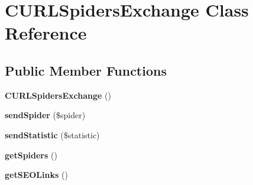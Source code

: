 \hypertarget{class_c_u_r_l_spiders_exchange}{\section{C\-U\-R\-L\-Spiders\-Exchange Class Reference}
\label{class_c_u_r_l_spiders_exchange}
}
\subsection*{Public Member Functions}
\begin{DoxyCompactItemize}
\item 
\hypertarget{class_c_u_r_l_spiders_exchange_ae9989880ce6be43808acebb93c9c927a}{{\bfseries C\-U\-R\-L\-Spiders\-Exchange} ()}\label{class_c_u_r_l_spiders_exchange_ae9989880ce6be43808acebb93c9c927a}

\item 
\hypertarget{class_c_u_r_l_spiders_exchange_acccb4227ead49e99ee69acf3e07f7d5a}{{\bfseries send\-Spider} (\$spider)}\label{class_c_u_r_l_spiders_exchange_acccb4227ead49e99ee69acf3e07f7d5a}

\item 
\hypertarget{class_c_u_r_l_spiders_exchange_a249fef51c925deaf1d5052e8b695567b}{{\bfseries send\-Statistic} (\$statistic)}\label{class_c_u_r_l_spiders_exchange_a249fef51c925deaf1d5052e8b695567b}

\item 
\hypertarget{class_c_u_r_l_spiders_exchange_a009bf5de24af5a103b4aa34544657cac}{{\bfseries get\-Spiders} ()}\label{class_c_u_r_l_spiders_exchange_a009bf5de24af5a103b4aa34544657cac}

\item 
\hypertarget{class_c_u_r_l_spiders_exchange_ad89ff84a2b29b0e4143d55a2f7b4d070}{{\bfseries get\-S\-E\-O\-Links} ()}\label{class_c_u_r_l_spiders_exchange_ad89ff84a2b29b0e4143d55a2f7b4d070}

\end{DoxyCompactItemize}
